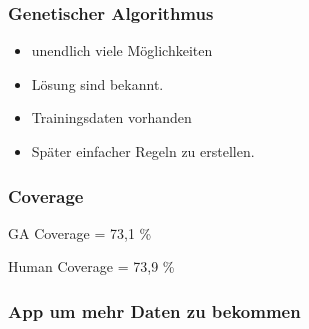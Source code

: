 \begin{frame}
    \frametitle{Genetischer Algorithmus}
    \begin{itemize}
      \item unendlich viele Möglichkeiten
      \item Lösung sind bekannt.
      \item Trainingsdaten vorhanden
      \item Später einfacher Regeln zu erstellen.
    \end{itemize}
\end{frame}

\begin{frame}
  \frametitle{Coverage}
  \begin{center}
  \huge{GA Coverage = 73,1 \%}
  \end{center}
  \begin{center}
  \huge{Human Coverage = 73,9 \%}
  \end{center}
\end{frame}


\begin{frame}
    \frametitle{App um mehr Daten zu bekommen}
\end{frame}

